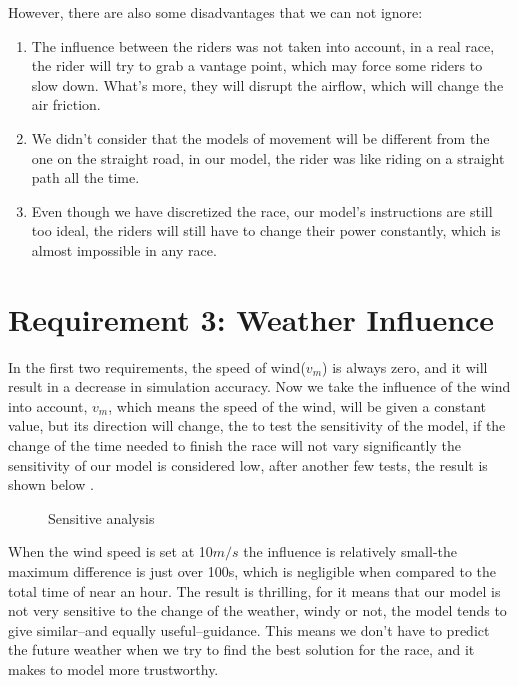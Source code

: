\documentclass[12pt]{article}
\begin{document}
However, there are also some disadvantages that we can not ignore:
\begin{enumerate}
    \item The influence between the riders was not taken into account, in a real race, the rider will try to grab a vantage point, which may force some riders to
          slow down. What's more, they will disrupt the airflow, which will change the air friction.%
    \item We didn't consider that the models of movement will be different from the one on the straight road, in our model, the rider was like riding on a straight path
          all the time.%
    \item Even though we have discretized the race, our model’s instructions are still too ideal, the riders will still have to change their power constantly, which is
          almost impossible in any race. %
\end{enumerate}
\section{Requirement 3: Weather Influence}
In the first two requirements, the speed of wind($v_m$) is always zero, and it will result in a decrease in simulation accuracy.
Now we take the influence of the wind into account,  $v_m$, which means the speed of the wind, will be given a constant value, but its direction will change, the
to test the sensitivity of the model, if the change of the time needed to finish the race will not vary significantly the sensitivity of our model
is considered low, after another few tests, the result is shown below
.
\begin{figure}
    \centering
    
    \caption{Sensitive analysis}
\end{figure}
When the wind speed is set at 10$m/s$ the influence is relatively small-the maximum difference is just over 100s, which is negligible when compared to the total time of
near an hour. The result is thrilling, for it means that our model is not very sensitive to the change of the weather, windy or not, the model tends to give similar--and
equally useful--guidance. This means we don't have to predict the future weather when we try to find the best solution for the race, and it makes to model more trustworthy.
\end{document}
